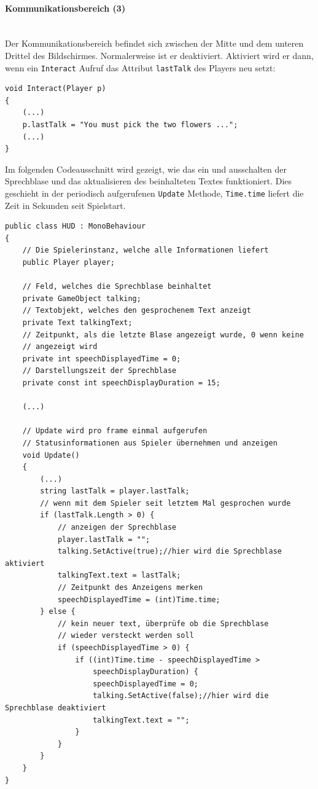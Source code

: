 \paragraph{Kommunikationsbereich (3)}\mbox{} \\
Der Kommunikationsbereich befindet sich zwischen der Mitte und dem unteren Drittel des Bildschirmes.
Normalerweise ist er deaktiviert.
Aktiviert wird er dann, wenn ein \lstinline{Interact} Aufruf das Attribut \lstinline{lastTalk} des Players neu setzt:

\begin{lstlisting}[caption={Kommunikation setzen}]
void Interact(Player p)
{
	(...)
	p.lastTalk = "You must pick the two flowers ...";
	(...)
}
\end{lstlisting}

Im folgenden Codeausschnitt wird gezeigt, wie das ein und ausschalten der Sprechblase und  das aktualisieren des beinhalteten Textes funktioniert. Dies geschieht in der periodisch aufgerufenen \lstinline{Update} Methode, \lstinline{Time.time} liefert die Zeit in Sekunden seit Spielstart.

\begin{lstlisting}[caption={Sprechblase ein- und ausblenden}]
public class HUD : MonoBehaviour
{
	// Die Spielerinstanz, welche alle Informationen liefert
	public Player player;

	// Feld, welches die Sprechblase beinhaltet
	private GameObject talking;
	// Textobjekt, welches den gesprochenem Text anzeigt
	private Text talkingText;
	// Zeitpunkt, als die letzte Blase angezeigt wurde, 0 wenn keine 
	// angezeigt wird
	private int speechDisplayedTime = 0;
	// Darstellungszeit der Sprechblase
	private const int speechDisplayDuration = 15;

	(...)
	
	// Update wird pro frame einmal aufgerufen
	// Statusinformationen aus Spieler übernehmen und anzeigen
	void Update()
	{
		(...)
		string lastTalk = player.lastTalk;
		// wenn mit dem Spieler seit letztem Mal gesprochen wurde
		if (lastTalk.Length > 0) {
			// anzeigen der Sprechblase
			player.lastTalk = "";
			talking.SetActive(true);//hier wird die Sprechblase aktiviert
			talkingText.text = lastTalk;
			// Zeitpunkt des Anzeigens merken
			speechDisplayedTime = (int)Time.time;
		} else {
			// kein neuer text, überprüfe ob die Sprechblase 
			// wieder versteckt werden soll
			if (speechDisplayedTime > 0) {
				if ((int)Time.time - speechDisplayedTime > 
					speechDisplayDuration) {
					speechDisplayedTime = 0;
					talking.SetActive(false);//hier wird die Sprechblase deaktiviert
					talkingText.text = "";
				}
			}
		}	
	}
}
\end{lstlisting}


